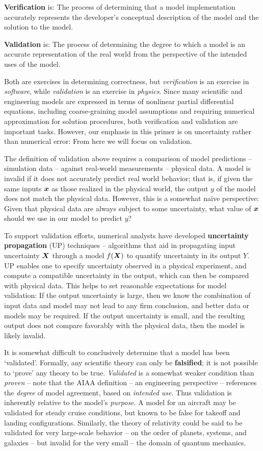 \documentclass[../primer.tex]{subfiles}
\begin{document}
\textbf{Verification} is: The process of determining that a model implementation
accurately represents the developer's conceptual description of the model and
the solution to the model.

\textbf{Validation} is: The process of determining the degree to which a model
is an accurate representation of the real world from the perspective of the
intended uses of the model.

Both are exercises in determining correctness, but \emph{verification} is an
exercise in \emph{software}, while \emph{validation} is an exercise in
\emph{physics}. Since many scientific and engineering models are expressed in
terms of nonlinear partial differential equations, including coarse-graining
model assumptions and requiring numerical approximation for solution procedures,
both verification and validation are important tasks. However, our emphasis in
this primer is on uncertainty rather than numerical error: From here we will
focus on validation.

The definition of validation above requires a comparison of model predictions --
simulation data -- against real-world measurements -- physical data. A model is
invalid if it does not accurately predict real world behavior; that is, if given
the same inputs $\boldsymbol{x}$ as those realized in the physical world, the output $y$ of
the model does not match the physical data. However, this is a somewhat na\"ive
perspective: Given that physical data are always subject to some uncertainty,
what value of $\boldsymbol{x}$ should we use in our model to predict $y$?

To support validation efforts, numerical analysts have developed
\textbf{uncertainty propagation} (UP) techniques -- algorithms that aid in
propagating input uncertainty $\boldsymbol{X}$ through a model $f(\boldsymbol{X})$ to quantify
uncertainty in its output $Y$. UP enables one to specify uncertainty observed in
a physical experiment, and compute a compatible uncertainty in the output, which
can then be compared with physical data. This helps to set reasonable
expectations for model validation: If the output uncertainty is large, then we
know the combination of input data and model may not lead to any firm
conclusion, and better data or models may be required. If the output uncertainty
is small, and the resulting output does not compare favorably with the physical
data, then the model is likely invalid.

It is somewhat difficult to conclusively determine that a model has been
`validated'. Formally, any scientific theory can only be \textbf{falsified}; it
is not possible to `prove' any theory to be true.\cite{popper2005logic}
\emph{Validated} is a somewhat weaker condition than \emph{proven} -- note that
the AIAA definition -- an engineering perspective -- references the
\emph{degree} of model agreement, based on \emph{intended use}. Thus validation
is inherently relative to the model's \emph{purpose}. A model for an aircraft
may be validated for steady cruise conditions, but known to be false for takeoff
and landing configurations. Similarly, the theory of relativity could be said to
be validated for very large-scale behavior -- on the order of planets, systems,
and galaxies -- but invalid for the very small -- the domain of quantum
mechanics.
\end{document}

